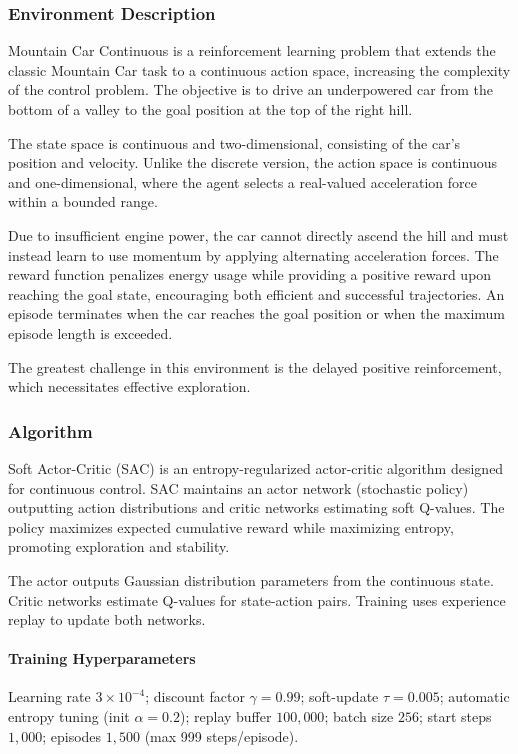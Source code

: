 \documentclass[10pt]{article}
\begin{document}
\vspace{1em}

\subsubsection{Environment Description}
Mountain Car Continuous is a reinforcement learning problem that extends the classic Mountain Car task to a continuous action space, increasing the complexity of the control problem. The objective is to drive an underpowered car from the bottom of a valley to the goal position at the top of the right hill.

The state space is continuous and two-dimensional, consisting of the car’s position and velocity. Unlike the discrete version, the action space is continuous and one-dimensional, where the agent selects a real-valued acceleration force within a bounded range.

Due to insufficient engine power, the car cannot directly ascend the hill and must instead learn to use momentum by applying alternating acceleration forces. The reward function penalizes energy usage while providing a positive reward upon reaching the goal state, encouraging both efficient and successful trajectories. An episode terminates when the car reaches the goal position or when the maximum episode length is exceeded.

The greatest challenge in this environment is the delayed positive reinforcement, which necessitates effective exploration.

\subsubsection{Algorithm}
Soft Actor-Critic (SAC) is an entropy-regularized actor-critic algorithm designed for continuous control. SAC maintains an actor network (stochastic policy) outputting action distributions and critic networks estimating soft Q-values. The policy maximizes expected cumulative reward while maximizing entropy, promoting exploration and stability.

The actor outputs Gaussian distribution parameters from the continuous state. Critic networks estimate Q-values for state-action pairs. Training uses experience replay to update both networks.

\paragraph{Training Hyperparameters}
Learning rate $3\times 10^{-4}$; discount factor $\gamma = 0.99$; soft-update $\tau = 0.005$; automatic entropy tuning (init $\alpha = 0.2$); replay buffer $100{,}000$; batch size $256$; start steps $1{,}000$; episodes $1{,}500$ (max 999 steps/episode).
\end{document}
